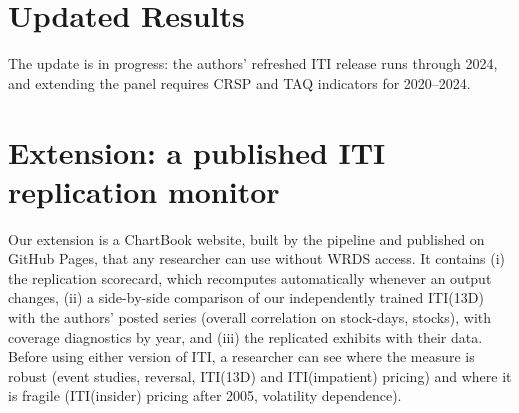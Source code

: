 \documentclass{article}
\begin{document}
\section{Updated Results}
The update is in progress: the authors' refreshed ITI release runs through 2024,
and extending the panel requires CRSP and TAQ indicators for 2020--2024.

\section{Extension: a published ITI replication monitor}
Our extension is a ChartBook website, built by the pipeline and published on
GitHub Pages, that any researcher can use without WRDS access. It contains
(i) the replication scorecard, which recomputes automatically whenever an output
changes, (ii) a side-by-side comparison of our independently trained ITI(13D)
with the authors' posted series (overall correlation \AgreePearson{} on
\AgreeRows{} stock-days, \AgreeStocks{} stocks), with coverage diagnostics by
year, and (iii) the replicated exhibits with their data. Before using either
version of ITI, a researcher can see where the measure is robust (event
studies, reversal, ITI(13D) and ITI(impatient) pricing) and where it is fragile
(ITI(insider) pricing after 2005, volatility dependence).



\end{document}
